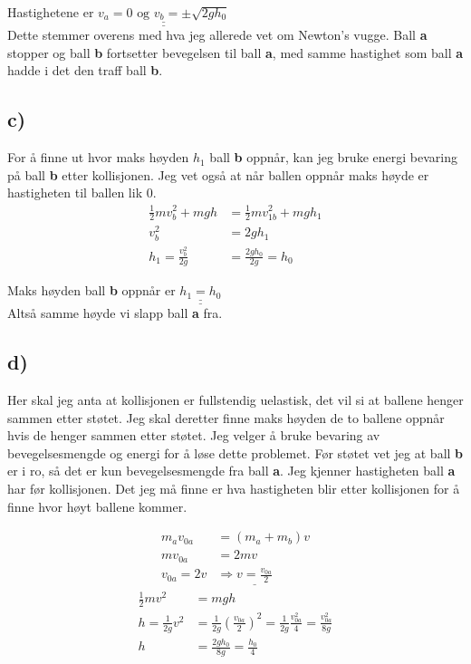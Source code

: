 \documentclass[a4paper,12pt,norsk]{article}
\begin{document}
Hastighetene er $\underline{\underline{v_a = 0\textrm{ og } v_b = \pm\sqrt{2gh_0}}}$\\ Dette stemmer overens med hva jeg allerede vet om Newton's vugge. Ball \textbf{a} stopper og ball \textbf{b} fortsetter bevegelsen til ball \textbf{a}, med samme hastighet som ball \textbf{a} hadde i det den traff ball \textbf{b}.

\subsection*{c)}
For å finne ut hvor maks høyden $h_1$ ball \textbf{b} oppnår, kan jeg bruke energi bevaring på ball \textbf{b} etter kollisjonen. Jeg vet også at når ballen oppnår maks høyde er hastigheten til ballen lik 0.
\begin{align*}
\frac{1}{2}mv_b^2 + mgh &= \frac{1}{2}mv_{1b}^2 + mgh_1\\
v_b^2 &= 2gh_1\\
h_1 = \frac{v_b^2}{2g} &= \frac{2gh_0}{2g} = h_0
\end{align*}

Maks høyden ball \textbf{b} oppnår er $\underline{\underline{h_1=h_0}}$\\ Altså samme høyde vi slapp ball \textbf{a} fra.

\subsection*{d)}
Her skal jeg anta at kollisjonen er fullstendig uelastisk, det vil si at ballene henger sammen etter støtet. Jeg skal deretter finne maks høyden de to ballene oppnår hvis de henger sammen etter støtet. Jeg velger å bruke bevaring av bevegelsesmengde og energi for å løse dette problemet. Før støtet vet jeg at ball \textbf{b} er i ro, så det er kun bevegelsesmengde fra ball \textbf{a}. Jeg kjenner hastigheten ball \textbf{a} har før kollisjonen. Det jeg må finne er hva hastigheten blir etter kollisjonen for å finne hvor høyt ballene kommer. 

\begin{align*}
m_av_{0a} &= (m_a+m_b)v\\ 
mv_{0a} &= 2mv\\
v_{0a} = 2v &\Rightarrow \underline{v = \frac{v_{0a}}{2}}
\end{align*}
\begin{align*}
\frac{1}{2}mv^2 &= mgh\\
h = \frac{1}{2g}v^2 &= \frac{1}{2g}(\frac{v_{0a}}{2})^2 = \frac{1}{2g}\frac{v_{0a}^2}{4} = \frac{v_{0a}^2}{8g}\\
h &= \frac{2gh_0}{8g} = \frac{h_0}{4}
\end{align*}
\end{document}
